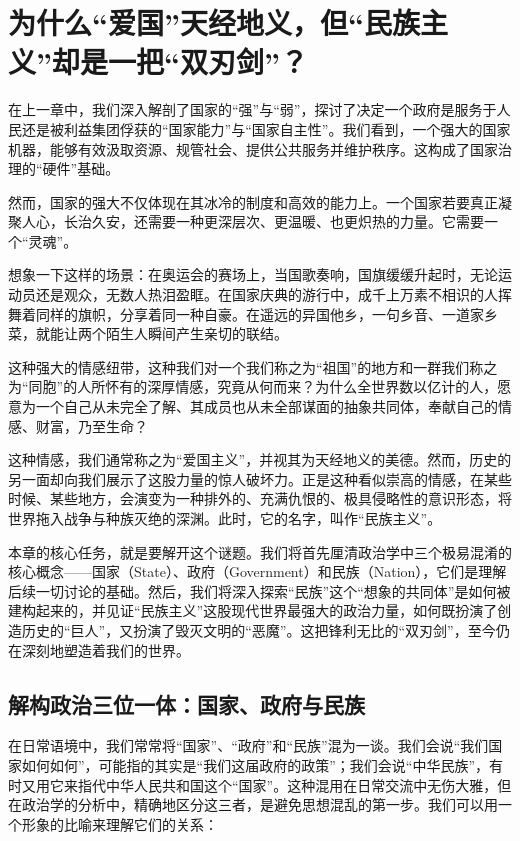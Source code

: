

\chapter{为什么“爱国”天经地义，但“民族主义”却是一把“双刃剑”？}

在上一章中，我们深入解剖了国家的“强”与“弱”，探讨了决定一个政府是服务于人民还是被利益集团俘获的“国家能力”与“国家自主性”。我们看到，一个强大的国家机器，能够有效汲取资源、规管社会、提供公共服务并维护秩序。这构成了国家治理的“硬件”基础。

然而，国家的强大不仅体现在其冰冷的制度和高效的能力上。一个国家若要真正凝聚人心，长治久安，还需要一种更深层次、更温暖、也更炽热的力量。它需要一个“灵魂”。

想象一下这样的场景：在奥运会的赛场上，当国歌奏响，国旗缓缓升起时，无论运动员还是观众，无数人热泪盈眶。在国家庆典的游行中，成千上万素不相识的人挥舞着同样的旗帜，分享着同一种自豪。在遥远的异国他乡，一句乡音、一道家乡菜，就能让两个陌生人瞬间产生亲切的联结。

这种强大的情感纽带，这种我们对一个我们称之为“祖国”的地方和一群我们称之为“同胞”的人所怀有的深厚情感，究竟从何而来？为什么全世界数以亿计的人，愿意为一个自己从未完全了解、其成员也从未全部谋面的抽象共同体，奉献自己的情感、财富，乃至生命？

这种情感，我们通常称之为“爱国主义”，并视其为天经地义的美德。然而，历史的另一面却向我们展示了这股力量的惊人破坏力。正是这种看似崇高的情感，在某些时候、某些地方，会演变为一种排外的、充满仇恨的、极具侵略性的意识形态，将世界拖入战争与种族灭绝的深渊。此时，它的名字，叫作“民族主义”。

本章的核心任务，就是要解开这个谜题。我们将首先厘清政治学中三个极易混淆的核心概念——国家（State）、政府（Government）和民族（Nation），它们是理解后续一切讨论的基础。然后，我们将深入探索“民族”这个“想象的共同体”是如何被建构起来的，并见证“民族主义”这股现代世界最强大的政治力量，如何既扮演了创造历史的“巨人”，又扮演了毁灭文明的“恶魔”。这把锋利无比的“双刃剑”，至今仍在深刻地塑造着我们的世界。

\hrulefill

\section{解构政治三位一体：国家、政府与民族}

在日常语境中，我们常常将“国家”、“政府”和“民族”混为一谈。我们会说“我们国家如何如何”，可能指的其实是“我们这届政府的政策”；我们会说“中华民族”，有时又用它来指代中华人民共和国这个“国家”。这种混用在日常交流中无伤大雅，但在政治学的分析中，精确地区分这三者，是避免思想混乱的第一步。我们可以用一个形象的比喻来理解它们的关系：

